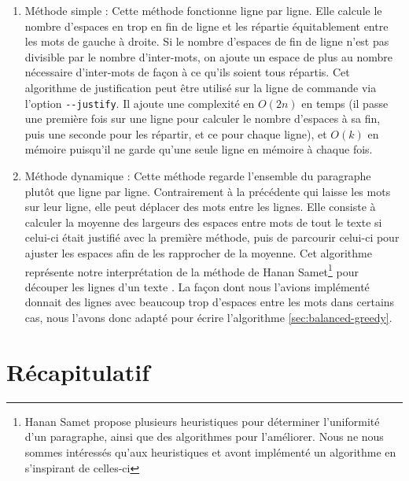 \documentclass[a4paper, 11pt]{article}
\begin{document}
\begin{enumerate}
    \item Méthode simple : Cette méthode fonctionne ligne par ligne. Elle
        calcule le nombre d'espaces en trop en fin de ligne et les répartie
        équitablement entre les mots de gauche à droite. Si le nombre d'espaces
        de fin de ligne n'est pas divisible par le nombre d'inter-mots, on
        ajoute un espace de plus au nombre nécessaire d'inter-mots de façon à ce
        qu'ils soient tous répartis. Cet algorithme de justification peut être
        utilisé sur la ligne de commande via l'option \verb|--justify|.
        Il ajoute une complexité en $O(2n)$ en temps (il passe une première fois
        sur une ligne pour calculer le nombre d'espaces à sa fin, puis une
        seconde pour les répartir, et ce pour chaque ligne), et $O(k)$ en
        mémoire puisqu'il ne garde qu'une seule ligne en mémoire à chaque fois.
    \item Méthode dynamique : Cette méthode regarde l'ensemble du paragraphe
        plutôt que ligne par ligne. Contrairement à la précédente qui laisse les
        mots sur leur ligne, elle peut déplacer des mots entre les lignes. Elle
        consiste à calculer la moyenne des largeurs des espaces entre mots de
        tout le texte si celui-ci était justifié avec la première méthode, puis
        de parcourir celui-ci pour ajuster les espaces afin de les rapprocher de
        la moyenne. Cet algorithme représente notre interprétation de la méthode
        de Hanan Samet\footnote{Hanan Samet propose plusieurs heuristiques pour
        déterminer l'uniformité d'un paragraphe, ainsi que des algorithmes pour
        l'améliorer. Nous ne nous sommes intéressés qu'aux heuristiques et avont
        implémenté un algorithme en s'inspirant de celles-ci} pour découper les
        lignes d'un texte \cite{Samet82}. La façon dont nous l'avions implémenté
        donnait des lignes avec beaucoup trop d'espaces entre les mots dans
        certains cas, nous l'avons donc adapté pour écrire l'algorithme
        \ref{sec:balanced-greedy}.
\end{enumerate}

\section{Récapitulatif}


\newpage


\end{document}
